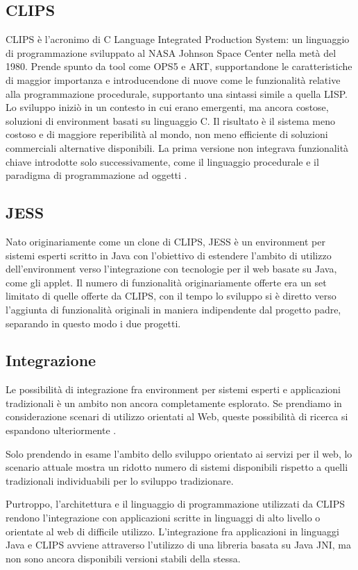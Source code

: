 \subsection{CLIPS}
CLIPS è l'acronimo di C Language Integrated Production System: un linguaggio di programmazione sviluppato al NASA Johnson Space Center nella metà del 1980. Prende spunto da tool come OPS5 e ART, supportandone le caratteristiche di maggior importanza e introducendone di nuove come le funzionalità relative alla programmazione procedurale, supportanto una sintassi simile a quella LISP. Lo sviluppo iniziò in un contesto in cui erano emergenti, ma ancora costose, soluzioni di environment basati su linguaggio C. Il risultato è il sistema meno costoso e di maggiore reperibilità al mondo, non meno efficiente di soluzioni commerciali alternative disponibili. La prima versione non integrava funzionalità chiave introdotte solo successivamente, come il linguaggio procedurale e il paradigma di programmazione ad oggetti \cite{jackson1999}.

\subsection{JESS}
Nato originariamente come un clone di CLIPS, JESS è un environment per sistemi esperti scritto in Java con l'obiettivo di estendere l'ambito di utilizzo dell'environment verso l'integrazione con tecnologie per il web basate su Java, come gli applet. Il numero di funzionalità originariamente offerte era un set limitato di quelle offerte da CLIPS, con il tempo lo sviluppo si è diretto verso l'aggiunta di funzionalità originali in maniera indipendente dal progetto padre, separando in questo modo i due progetti.

\subsection{Integrazione}
Le possibilità di integrazione fra environment per sistemi esperti e applicazioni tradizionali è un ambito non ancora completamente esplorato. Se prendiamo in considerazione scenari di utilizzo orientati al Web, queste possibilità di ricerca si espandono ulteriormente .

Solo prendendo in esame l'ambito dello sviluppo orientato ai servizi per il web, lo scenario attuale mostra un ridotto numero di sistemi disponibili rispetto a quelli tradizionali individuabili \cite{dokas2005} per lo sviluppo tradizionare.

Purtroppo, l'architettura e il linguaggio di programmazione utilizzati da CLIPS rendono l'integrazione con applicazioni scritte in linguaggi di alto livello o orientate al web di difficile utilizzo. L'integrazione fra applicazioni in linguaggi Java e CLIPS avviene attraverso l'utilizzo di una libreria basata su Java JNI, ma non sono ancora disponibili versioni stabili della stessa.

